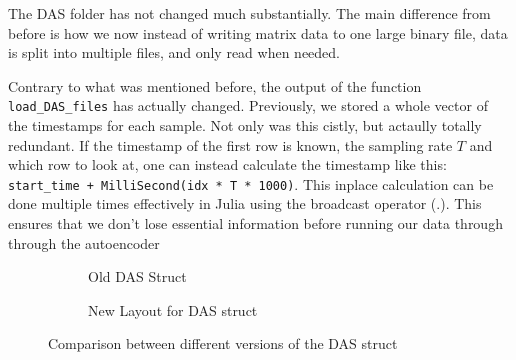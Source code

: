 

The DAS folder has not changed much substantially. The main difference from before is how we now instead of writing matrix data to one large binary file, data is split into multiple files, and only read when needed.

Contrary to what was mentioned before, the output of the function \texttt{load\_DAS\_files} has actually changed. Previously, we stored a whole vector of the timestamps for each sample. Not only was this cistly, but actaully totally redundant. If the timestamp of the first row is known, the sampling rate $T$ and which row to look at, one can instead calculate the timestamp like this: 
\lstinline|start_time + MilliSecond(idx * T * 1000)|. This inplace calculation can be done multiple times effectively in Julia using the broadcast operator (.). This ensures that we don't lose essential information before running our data through through the autoencoder

\begin{figure}[h]
\centering
\begin{subfigure}{.5\textwidth}
  \centering
  
  \caption{Old DAS Struct}
  \label{fig:olddasstc}
\end{subfigure}%
\begin{subfigure}{.5\textwidth}
  \centering
  
  \caption{New Layout for DAS struct}
  \label{fig:newdasstc}
\end{subfigure}
\caption{Comparison between different versions of the DAS struct}
\label{fig:dasstccmp}
\end{figure}